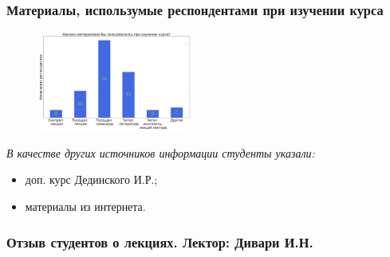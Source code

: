 	\subsubsection{Материалы, использумые респондентами при изучении курса}

		\begin{figure}[H]
			\centering
			\includegraphics[width = 0.45\textwidth]{images/1 course/Информатика/materials.png}
		\end{figure}

		\textit{В качестве других источников информации студенты указали:} 
		\begin{itemize}
			\item доп. курс Дединского И.Р.;
			\item материалы из интернета.
		\end{itemize}

	\subsubsection{Отзыв студентов о лекциях. Лектор: Дивари И.Н.}


